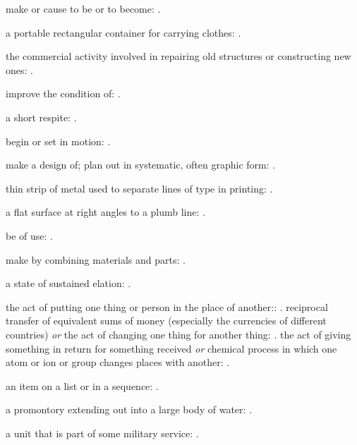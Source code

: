   make or cause to be or to become:   .

  a portable rectangular container for carrying clothes:   .

  the commercial activity involved in repairing old structures or constructing new ones:   .

  improve the condition of:   .

  a short respite:   .

  begin or set in motion:   .

  make a design of; plan out in systematic, often graphic form:   .

  thin strip of metal used to separate lines of type in printing:   .

  a flat surface at right angles to a plumb line:   .

  be of use:   .

  make by combining materials and parts:   .

  a state of sustained elation:   .

  the act of putting one thing or person in the place of another::   . reciprocal transfer of equivalent sums of money (especially the currencies of different countries) \textit{or} the act of changing one thing for another thing:   . the act of giving something in return for something received \textit{or} chemical process in which one atom or ion or group changes places with another: .

  an item on a list or in a sequence:   .

  a promontory extending out into a large body of water: .

  a unit that is part of some military service:   .

